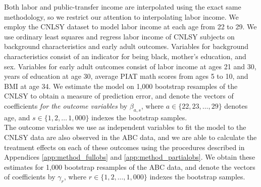\noindent Both labor and public-transfer income are interpolated using the exact same methodology, so we restrict
our attention to interpolating labor income. We employ the CNLSY dataset to model labor
income at each age from 22 to 29. We use ordinary least squares and regress labor income of
CNLSY subjects on background characteristics and early adult outcomes. Variables for background
characteristics consist of an indicator for being  black, mother's education, and sex. Variables
for early adult outcomes consist of labor income at ages 21 and 30, years of education at age 30, average
PIAT math scores from ages 5 to 10, and BMI at age 34. We estimate the model on 1,000 bootstrap
resamples of the CNLSY to obtain a measure of prediction error, and denote the vectors of coefficients
\emph{for the outcome variables} by $\beta_{a,s}$, where $a \in \{22, 23, \dots, 29\}$ denotes age, and
$s \in \{1,2,\dots\,1,000\}$ indexes the bootstrap samples. \\




\noindent The outcome variables we use as independent variables to fit the model to the CNLSY data are also
observed in the ABC data, and we are able to calculate the treatment effects on each of these outcomes
using the procedures described in Appendices \ref{app:method_fullobs} and \ref{app:method_partialobs}. We
obtain these estimates for 1,000 bootstrap resamples of the ABC data, and denote the vectors of
coefficients by $\gamma_r$, where $r \in \{1,2,\dots,1,000\}$ indexes the bootstrap samples. \\

